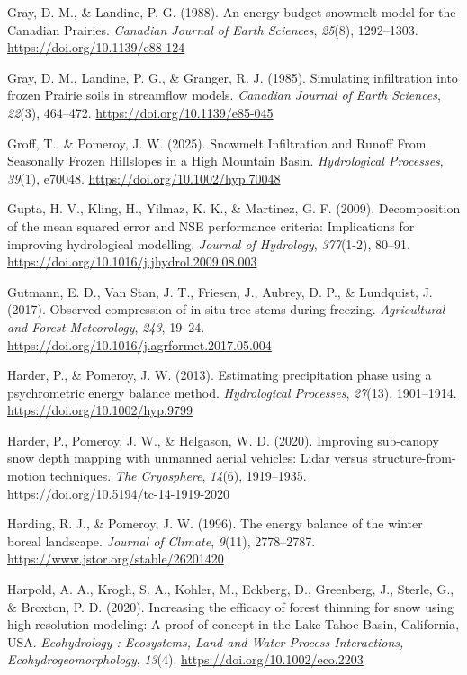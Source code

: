 \documentclass[
  letterpaper,
]{tex/uofsthesis-cs}
\newlength{\cslhangindent}
\newenvironment{CSLReferences}[2] %
 {\begin{list}{}{%
  \setlength{\itemindent}{0pt}
  \setlength{\leftmargin}{0pt}
  \setlength{\parsep}{0pt}
  \ifodd #1
   \setlength{\leftmargin}{\cslhangindent}
   \setlength{\itemindent}{-1\cslhangindent}
  \fi
  \setlength{\itemsep}{#2\baselineskip}}}
 {\end{list}}
\begin{document}
\begin{CSLReferences}{1}{0}
Gray, D. M., \& Landine, P. G. (1988). An energy-budget snowmelt model
for the {Canadian Prairies}. \emph{Canadian Journal of Earth Sciences},
\emph{25}(8), 1292--1303. \url{https://doi.org/10.1139/e88-124}

Gray, D. M., Landine, P. G., \& Granger, R. J. (1985). Simulating
infiltration into frozen {Prairie} soils in streamflow models.
\emph{Canadian Journal of Earth Sciences}, \emph{22}(3), 464--472.
\url{https://doi.org/10.1139/e85-045}

Groff, T., \& Pomeroy, J. W. (2025). Snowmelt {Infiltration} and {Runoff
From Seasonally Frozen Hillslopes} in a {High Mountain Basin}.
\emph{Hydrological Processes}, \emph{39}(1), e70048.
\url{https://doi.org/10.1002/hyp.70048}

Gupta, H. V., Kling, H., Yilmaz, K. K., \& Martinez, G. F. (2009).
Decomposition of the mean squared error and {NSE} performance criteria:
{Implications} for improving hydrological modelling. \emph{Journal of
Hydrology}, \emph{377}(1-2), 80--91.
\url{https://doi.org/10.1016/j.jhydrol.2009.08.003}

Gutmann, E. D., Van Stan, J. T., Friesen, J., Aubrey, D. P., \&
Lundquist, J. (2017). Observed compression of in situ tree stems during
freezing. \emph{Agricultural and Forest Meteorology}, \emph{243},
19--24. \url{https://doi.org/10.1016/j.agrformet.2017.05.004}

Harder, P., \& Pomeroy, J. W. (2013). Estimating precipitation phase
using a psychrometric energy balance method. \emph{Hydrological
Processes}, \emph{27}(13), 1901--1914.
\url{https://doi.org/10.1002/hyp.9799}

Harder, P., Pomeroy, J. W., \& Helgason, W. D. (2020). Improving
sub-canopy snow depth mapping with unmanned aerial vehicles: {Lidar}
versus structure-from-motion techniques. \emph{The Cryosphere},
\emph{14}(6), 1919--1935. \url{https://doi.org/10.5194/tc-14-1919-2020}

Harding, R. J., \& Pomeroy, J. W. (1996). The energy balance of the
winter boreal landscape. \emph{Journal of Climate}, \emph{9}(11),
2778--2787. \url{https://www.jstor.org/stable/26201420}

Harpold, A. A., Krogh, S. A., Kohler, M., Eckberg, D., Greenberg, J.,
Sterle, G., \& Broxton, P. D. (2020). Increasing the efficacy of forest
thinning for snow using high-resolution modeling: {A} proof of concept
in the {Lake Tahoe Basin}, {California}, {USA}. \emph{Ecohydrology :
Ecosystems, Land and Water Process Interactions, Ecohydrogeomorphology},
\emph{13}(4). \url{https://doi.org/10.1002/eco.2203}


\end{CSLReferences}
\end{document}
